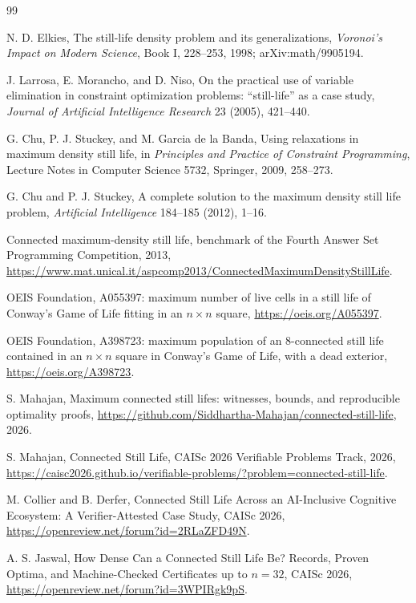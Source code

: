 \documentclass[10pt]{article}
\theoremstyle{remark}
\begin{document}
\begingroup
\footnotesize
\begin{thebibliography}{99}

N. D. Elkies,
The still-life density problem and its generalizations,
\emph{Voronoi's Impact on Modern Science}, Book I, 228--253, 1998;
arXiv:math/9905194.

J. Larrosa, E. Morancho, and D. Niso,
On the practical use of variable elimination in constraint optimization
problems: ``still-life'' as a case study,
\emph{Journal of Artificial Intelligence Research} 23 (2005), 421--440.

G. Chu, P. J. Stuckey, and M. Garcia de la Banda,
Using relaxations in maximum density still life,
in \emph{Principles and Practice of Constraint Programming},
Lecture Notes in Computer Science 5732, Springer, 2009, 258--273.

G. Chu and P. J. Stuckey,
A complete solution to the maximum density still life problem,
\emph{Artificial Intelligence} 184--185 (2012), 1--16.

Connected maximum-density still life, benchmark of the Fourth Answer Set
Programming Competition, 2013,
\url{https://www.mat.unical.it/aspcomp2013/ConnectedMaximumDensityStillLife}.

OEIS Foundation,
A055397: maximum number of live cells in a still life of Conway's Game of Life
fitting in an $n\times n$ square,
\url{https://oeis.org/A055397}.

OEIS Foundation,
A398723: maximum population of an 8-connected still life contained in an
$n\times n$ square in Conway's Game of Life, with a dead exterior,
\url{https://oeis.org/A398723}.

S. Mahajan,
Maximum connected still lifes: witnesses, bounds, and reproducible optimality
proofs, \url{https://github.com/Siddhartha-Mahajan/connected-still-life}, 2026.

S. Mahajan,
Connected Still Life, CAISc 2026 Verifiable Problems Track, 2026,
\url{https://caisc2026.github.io/verifiable-problems/?problem=connected-still-life}.

M. Collier and B. Derfer,
Connected Still Life Across an AI-Inclusive Cognitive Ecosystem: A
Verifier-Attested Case Study, CAISc 2026,
\url{https://openreview.net/forum?id=2RLaZFD49N}.

A. S. Jaswal,
How Dense Can a Connected Still Life Be? Records, Proven Optima, and
Machine-Checked Certificates up to $n=32$, CAISc 2026,
\url{https://openreview.net/forum?id=3WPIRgk9pS}.


\end{thebibliography}
\end{document}
